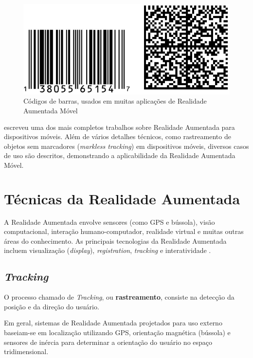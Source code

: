 \begin{figure}[h!]
    \centering
    \caption{Códigos de barras, usados em muitas aplicações de Realidade Aumentada Móvel}
    \label{fig:codigos-barras-qr-code}
    \includegraphics[width=13cm]{resources/codigo-barras-qr-code.png}
\end{figure}


\cite{HandheldAR} escreveu uma dos mais completos trabalhos sobre Realidade Aumentada para
dispositivos móveis. Além de vários detalhes técnicos, como rastreamento de objetos sem marcadores 
(\textit{markless tracking}) em dispositivos móveis, diversos casos de uso são descritos, demonstrando
a aplicabilidade da Realidade Aumentada Móvel.



\section{Técnicas da Realidade Aumentada}

A Realidade Aumentada envolve sensores (como \gls{GPS} e bússola), visão computacional,
interação humano-computador, realidade virtual e muitas outras áreas do conhecimento.
As principais tecnologias da Realidade Aumentada incluem visualização (\textit{display}),
\textit{registration}, \textit{tracking} e interatividade \cite{ARFeatureMaching}.



\subsection{\textit{Tracking}}

O processo chamado de \textit{Tracking}, ou \textbf{rastreamento}, consiste na detecção da posição e da direção
do usuário. 


Em geral, sistemas de Realidade Aumentada projetados para uso externo baseiam-se em localização
utilizando \gls{GPS}, orientação magnética (bússola) e sensores de inércia para determinar a 
orientação do usuário no espaço tridimensional. 

